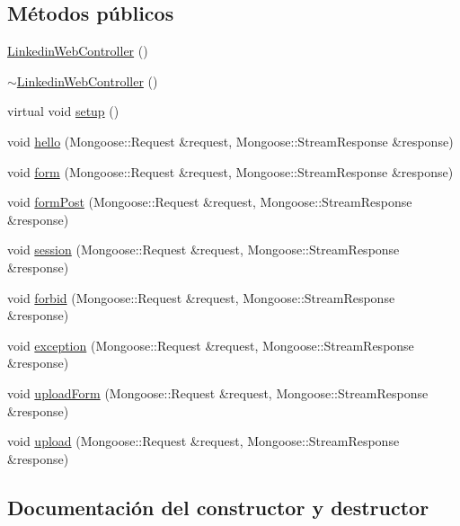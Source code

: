 \subsection*{Métodos públicos}
\begin{DoxyCompactItemize}
\item 
\hyperlink{classLinkedinWebController_a68424eeecce77f91b7e2a9f34928fde0}{Linkedin\+Web\+Controller} ()
\item 
\hyperlink{classLinkedinWebController_a9f795c0874b74594b8434317e2795e9a}{$\sim$\+Linkedin\+Web\+Controller} ()
\item 
virtual void \hyperlink{classLinkedinWebController_aa685544945b192b9149deaba1304f33b}{setup} ()
\item 
void \hyperlink{classLinkedinWebController_af300383547b94080bc7edbee9624b852}{hello} (Mongoose\+::\+Request \&request, Mongoose\+::\+Stream\+Response \&response)
\item 
void \hyperlink{classLinkedinWebController_a56c448409227ffb804019899ff5d4488}{form} (Mongoose\+::\+Request \&request, Mongoose\+::\+Stream\+Response \&response)
\item 
void \hyperlink{classLinkedinWebController_a20cc880e30969f5626f6553c6182a78f}{form\+Post} (Mongoose\+::\+Request \&request, Mongoose\+::\+Stream\+Response \&response)
\item 
void \hyperlink{classLinkedinWebController_acdbbbe5c9139f0f7959ca70df699c255}{session} (Mongoose\+::\+Request \&request, Mongoose\+::\+Stream\+Response \&response)
\item 
void \hyperlink{classLinkedinWebController_a44ae4397ca88552b07b6bc8e57c713fc}{forbid} (Mongoose\+::\+Request \&request, Mongoose\+::\+Stream\+Response \&response)
\item 
void \hyperlink{classLinkedinWebController_abe96bf2fa8e3084d45b34dda30331171}{exception} (Mongoose\+::\+Request \&request, Mongoose\+::\+Stream\+Response \&response)
\item 
void \hyperlink{classLinkedinWebController_a380a3e6b865576901e066b82a7279460}{upload\+Form} (Mongoose\+::\+Request \&request, Mongoose\+::\+Stream\+Response \&response)
\item 
void \hyperlink{classLinkedinWebController_a8cd6c4499d69595ddc6c349fa31c2c28}{upload} (Mongoose\+::\+Request \&request, Mongoose\+::\+Stream\+Response \&response)
\end{DoxyCompactItemize}


\subsection{Documentación del constructor y destructor}
\mbox{\label{classLinkedinWebController_a68424eeecce77f91b7e2a9f34928fde0}} 
